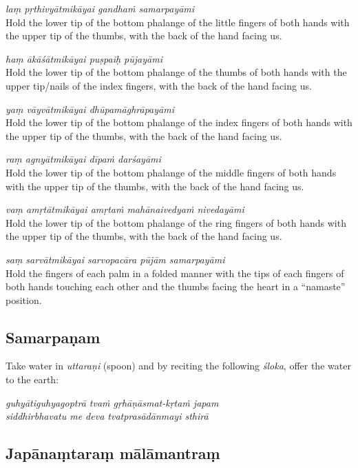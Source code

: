 \documentclass[11pt,oneside,a4paper]{article}
\newenvironment{shloka}[1]
  {\bigskip\center#1\varwidth{\linewidth}}
  {\endvarwidth\endcenter\bigskip}
\newcommand{\tl}[1]{\emph{#1}}
\begin{document}
\tl{laṃ pṛthivyātmikāyai gandhaṁ samarpayāmi}\\
Hold the lower tip of the bottom phalange of the little fingers of both hands
with the upper tip of the thumbs, with the back of the hand facing us.

\tl{haṃ ākāśātmikāyai puṣpaiḥ pūjayāmi}\\
Hold the lower tip of the bottom phalange of the thumbs of both hands with
the upper tip/nails of the index fingers, with the back of the hand facing us.

\tl{yaṃ vāyvātmikāyai dhūpamāghrāpayāmi}\\
Hold the lower tip of the bottom phalange of the index fingers of both hands
with the upper tip of the thumbs, with the back of the hand facing us.

\tl{raṃ agnyātmikāyai dīpaṁ darśayāmi}\\
Hold the lower tip of the bottom phalange of the middle fingers of both hands
with the upper tip of the thumbs, with the back of the hand facing us.

\tl{vaṃ amṛtātmikāyai amṛtaṁ mahānaivedyaṁ nivedayāmi}\\
Hold the lower tip of the bottom phalange of the ring fingers of both hands
with the upper tip of the thumbs, with the back of the hand facing us.

\tl{saṃ sarvātmikāyai sarvopacāra pūjām samarpayāmi}\\
Hold the fingers of each palm in a folded manner with the tips of each fingers
of both hands touching each other and the thumbs facing the heart in
a ``namaste'' position.

\subsection{Samarpaṇam}

Take water in \tl{uttaraṇi} (spoon) and by reciting the following \tl{śloka},
offer the water to the earth:

\begin{shloka}\itshape
  guhyātiguhyagoptrā tvaṁ gṛhāṇāsmat-kṛtaṁ japam\\
  siddhirbhavatu me deva tvatprasādānmayi sthirā
\end{shloka}

\subsection{Japānaṃtaraṃ mālāmantraṃ}
\end{document}
